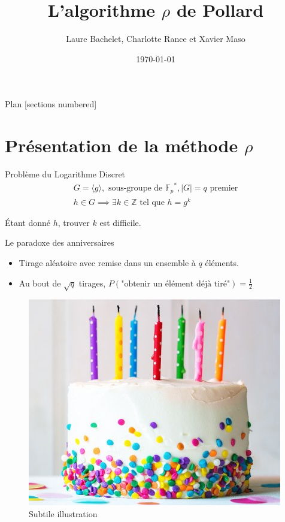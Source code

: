 \documentclass{beamer}
\title{L'algorithme $\rho$ de Pollard}
\date{\today}
\author{Laure Bachelet, Charlotte Rance et Xavier Maso}
\institute{Master CSI, Université de Bordeaux}
\begin{document}
  \maketitle

  \begin{frame}{Plan}
    [sections numbered]
    \tableofcontents[hideallsubsections]
  \end{frame}


  \section{Présentation de la méthode $\rho$}

  \begin{frame}{Problème du Logarithme Discret}
    \begin{align*}
      G = \langle g \rangle, \text{\ sous-groupe de }{\mathbb{F}_p}^*, |G| = q \text{\ premier} \\
      h \in G \implies \exists k \in \mathbb{Z} \text{\ tel que } h = g^k
    \end{align*}

    \bigskip
    Étant donné $h$, trouver $k$ est difficile.
  \end{frame}


  \begin{frame}{Le paradoxe des anniversaires}
    \begin{itemize}
      \item[] Tirage aléatoire avec remise dans un ensemble à $q$ éléments.
      \item[] Au bout de $\sqrt{q}$ tirages, $P(\text{"obtenir un élément déjà tiré"}) = \frac{1}{2}$
    \end{itemize}

    \begin{figure}
      \center{}
      \includegraphics[scale=0.4]{images/birthday_cake.jpg}
      \caption{Subtile illustration}
    \end{figure}
  \end{frame}
\end{document}

